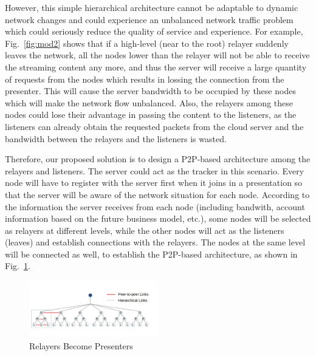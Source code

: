 However, this simple hierarchical architecture cannot be adaptable to
dynamic network changes and could experience an unbalanced network
traffic problem which could seriously reduce the quality of service and
experience. For example, Fig.~\ref{fig:mod2} shows that if a
high-level (near to the root) relayer suddenly leaves the network, all the
nodes lower than the relayer will not be able to receive the streaming content
any more, and thus the server will receive a large quantity of requests from the
nodes which results in lossing the connection from the presenter. This will cause the server
bandwidth to be occupied by these nodes which will make the network flow
unbalanced. Also, the relayers among these nodes could lose their advantage in
passing the content to the listeners, as the listeners can already obtain the
requested packets from the cloud server and the bandwidth between the relayers
and the listeners is wasted.

Therefore, our proposed solution is to design a P2P-based
architecture among the relayers
and listeners. The server could act as the tracker in this scenario. Every node
will have to register with the server first when it joins in a presentation so
that the server will be aware of the network situation for each node. According
to the information the server receives from each node (including bandwith,
account information based on the future business model, etc.), some nodes will
be selected as relayers at different levels, while the other nodes will act as
the listeners (leaves) and establish connections with the relayers. The nodes
at the same level will be connected as well, to establish the P2P-based
architecture, as shown in Fig.~\ref{fig:mod3}.


\begin{figure}[h!]
  \centering
      \includegraphics[width=0.5\textwidth]{figures/model3_test2.jpg}
  \caption{Relayers Become Presenters}
  \label{fig:mod3}
  \vspace{-0.15in}
\end{figure}

